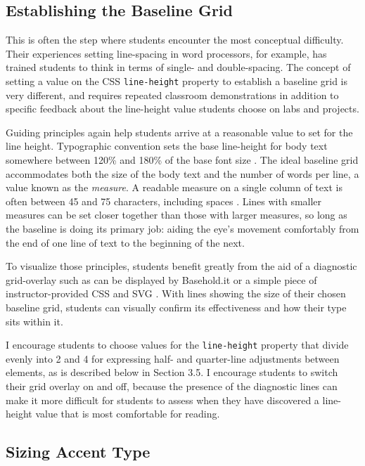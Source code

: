 \documentclass[sigplan,screen]{acmart}
\begin{document}
\subsection{Establishing the Baseline Grid}

This is often the step where students encounter the most conceptual difficulty. Their experiences setting line-spacing in word processors, for example, has trained students to think in terms of single- and double-spacing. The concept of setting a value on the CSS \verb|line-height| property to establish a baseline grid is very different, and requires repeated classroom demonstrations in addition to specific feedback about the line-height value students choose on labs and projects.

Guiding principles again help students arrive at a reasonable value to set for the line height. Typographic convention sets the base line-height for body text somewhere between 120\% and 180\% of the base font size  \cite[p.~92]{jsm:owt}. The ideal baseline grid accommodates both the size of the body text and the number of words per line, a value known as the {\itshape measure}. A readable measure on a single column of text is often between 45 and 75 characters, including spaces \cite[pp. 26–27]{rb:style}. Lines with smaller measures can be set closer together than those with larger measures, so long as the baseline is doing its primary job: aiding the eye's movement comfortably from the end of one line of text to the beginning of the next.

To visualize those principles, students benefit greatly from the aid of a diagnostic grid-overlay such as can be displayed by Basehold.it or a simple piece of instructor-provided CSS and SVG \cite{basehold}. With lines showing the size of their chosen baseline grid, students can visually confirm its effectiveness and how their type sits within it.

I encourage students to choose values for the \verb|line-height| property that divide evenly into 2 and 4 for expressing half- and quarter-line adjustments between elements, as is described below in Section 3.5. I encourage students to switch their grid overlay on and off, because the presence of the diagnostic lines can make it more difficult for students to assess when they have discovered a line-height value that is most comfortable for reading.

\subsection{Sizing Accent Type}
\end{document}
